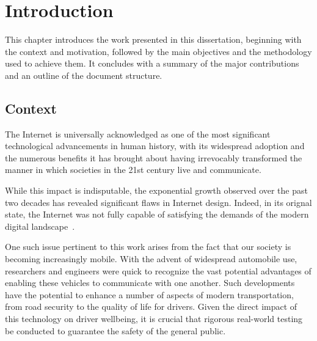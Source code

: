 
%

\chapter{Introduction}
\label{cha:introduction}

This chapter introduces the work presented in this dissertation, beginning with the context and motivation, followed by the main objectives and the methodology used to achieve them. It concludes with a summary of the major contributions and an outline of the document structure.

\section{Context} %
\label{sec:contex}



The Internet is universally acknowledged as one of the most significant technological advancements in human history, with its widespread adoption and the numerous benefits it has brought about having irrevocably transformed the manner in which societies in the 21st century live and communicate.

While this impact is indisputable, the exponential growth observed over the past two decades has revealed significant flaws in Internet design. Indeed, in its orignal state, the Internet was not fully capable of satisfying the demands of the modern digital landscape~\cite{feamster_road_2013}. 

One such issue pertinent to this work arises from the fact that our society is becoming increasingly mobile. With the advent of widespread automobile use, researchers and engineers were quick to recognize the vast potential advantages of enabling these vehicles to communicate with one another. Such developments have the potential to enhance a number of aspects of modern transportation, from road security to the quality of life for drivers.
Given the direct impact of this technology on driver wellbeing, it is crucial that rigorous real-world testing be conducted to guarantee the safety of the general public.

